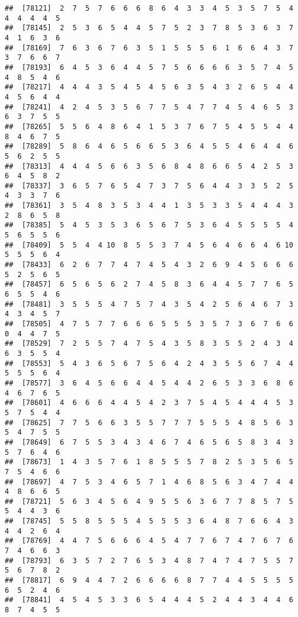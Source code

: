\documentclass[
]{book}
\begin{document}
\begin{verbatim}
##  [78121]  2  7  5  7  6  6  6  8  6  4  3  3  4  5  3  5  7  5  4  4  4  4  4  5
##  [78145]  2  5  3  6  5  4  4  5  7  5  2  3  7  8  5  3  6  3  7  4  1  6  3  6
##  [78169]  7  6  3  6  7  6  3  5  1  5  5  5  6  1  6  6  4  3  7  3  7  6  6  7
##  [78193]  6  4  5  3  6  4  4  5  7  5  6  6  6  6  3  5  7  4  5  4  8  5  4  6
##  [78217]  4  4  4  3  5  4  5  4  5  6  3  5  4  3  2  6  5  4  4  4  5  6  4  4
##  [78241]  4  2  4  5  3  5  6  7  7  5  4  7  7  4  5  4  6  5  3  6  3  7  5  5
##  [78265]  5  5  6  4  8  6  4  1  5  3  7  6  7  5  4  5  5  4  4  8  4  6  7  5
##  [78289]  5  8  6  4  6  5  6  6  5  3  6  4  5  5  4  6  4  4  6  5  6  2  5  5
##  [78313]  4  4  4  5  6  6  3  5  6  8  4  8  6  6  5  4  2  5  3  6  4  5  8  2
##  [78337]  3  6  5  7  6  5  4  7  3  7  5  6  4  4  3  3  5  2  5  4  3  3  7  6
##  [78361]  3  5  4  8  3  5  3  4  4  1  3  5  3  3  5  4  4  4  3  2  8  6  5  8
##  [78385]  5  4  5  3  5  3  6  5  6  7  5  3  6  4  5  5  5  5  4  5  6  5  5  6
##  [78409]  5  5  4  4 10  8  5  5  3  7  4  5  6  4  6  6  4  6 10  5  5  5  6  4
##  [78433]  6  2  6  7  7  4  7  4  5  4  3  2  6  9  4  5  6  6  6  5  2  5  6  5
##  [78457]  6  5  6  5  6  2  7  4  5  8  3  6  4  4  5  7  7  6  5  6  5  5  4  6
##  [78481]  3  5  5  5  4  7  5  7  4  3  5  4  2  5  6  4  6  7  3  4  3  4  5  7
##  [78505]  4  7  5  7  7  6  6  6  5  5  5  3  5  7  3  6  7  6  6  0  4  4  7  5
##  [78529]  7  2  5  5  7  4  7  5  4  3  5  8  3  5  5  2  4  3  4  6  3  5  5  4
##  [78553]  5  4  3  6  5  6  7  5  6  4  2  4  3  5  5  6  7  4  4  5  5  5  6  4
##  [78577]  3  6  4  5  6  6  4  4  5  4  4  2  6  5  3  3  6  8  6  4  6  7  6  5
##  [78601]  4  6  6  6  4  4  5  4  2  3  7  5  4  5  4  4  4  5  3  5  7  5  4  4
##  [78625]  7  7  5  6  6  3  5  5  7  7  7  5  5  5  4  8  5  6  3  5  4  7  5  5
##  [78649]  6  7  5  5  3  4  3  4  6  7  4  6  5  6  5  8  3  4  3  5  7  6  4  6
##  [78673]  1  4  3  5  7  6  1  8  5  5  5  7  8  2  5  3  5  6  5  7  5  4  6  6
##  [78697]  4  7  5  3  4  6  5  7  1  4  6  8  5  6  3  4  7  4  4  4  8  6  6  5
##  [78721]  5  6  3  4  5  6  4  9  5  5  6  3  6  7  7  8  5  7  5  5  4  4  3  6
##  [78745]  5  5  8  5  5  5  4  5  5  5  3  6  4  8  7  6  6  4  3  4  4  2  6  4
##  [78769]  4  4  7  5  6  6  6  4  5  4  7  7  6  7  4  7  6  7  6  7  4  6  6  3
##  [78793]  6  3  5  7  2  7  6  5  3  4  8  7  4  7  4  7  5  5  7  5  6  7  8  2
##  [78817]  6  9  4  4  7  2  6  6  6  6  8  7  7  4  4  5  5  5  5  6  5  2  4  6
##  [78841]  4  5  4  5  3  3  6  5  4  4  4  5  2  4  4  3  4  4  6  8  7  4  5  5

\end{verbatim}
\end{document}
